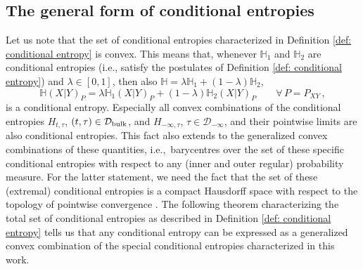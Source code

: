 \documentclass[aps,pra,11pt,onecolumn,nofootinbib,tightenlines]{revtex4-2}
\theoremstyle{definition}
\newcommand{\mc}[1]{\mathcal{#1}}
\newcommand{\mb}[1]{\mathbb{#1}}
\begin{document}
\subsection{The general form of conditional entropies}

Let us note that the set of conditional entropies characterized in Definition \ref{def: conditional entropy} is convex. This means that, whenever $\mb H_1$ and $\mb H_2$ are conditional entropies (i.e., satisfy the postulates of Definition \ref{def: conditional entropy}) and $\lambda\in[0,1]$, then also $\mb H=\lambda\mb H_1+(1-\lambda)\mb H_2$,
\begin{equation}
\mb H(X|Y)_P=\lambda\mb H_1(X|Y)_P+(1-\lambda)\mb H_2(X|Y)_P\qquad\forall\, P=P_{XY}\,,
\end{equation}
is a conditional entropy. Especially all convex combinations of the conditional entropies $H_{t,\tau}$, $(t,\tau)\in\mc D_{\rm bulk}$, and $H_{-\infty,\tau}$, $\tau\in\mc D_{-\infty}$, and their pointwise limits are also conditional entropies. This fact also extends to the generalized convex combinations of these quantities, i.e.,\ barycentres over the set of these specific conditional entropies with respect to any (inner and outer regular) probability measure. For the latter statement, we need the fact that the set of these (extremal) conditional entropies is a compact Hausdorff space with respect to the topology of pointwise convergence \cite[Proposition 8.5]{fritz2023abstractII}. The following theorem characterizing the total set of conditional entropies as described in Definition \ref{def: conditional entropy} tells us that any conditional entropy can be expressed as a generalized convex combination of the special conditional entropies characterized in this work.
\end{document}

